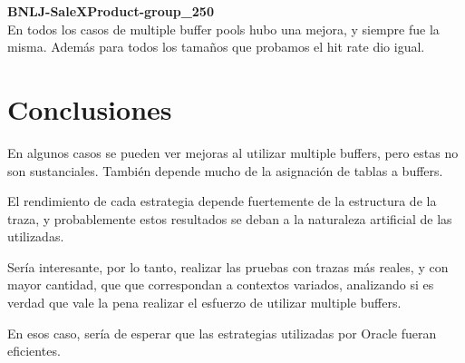 \textbf{BNLJ-SaleXProduct-group\_250} \\

En todos los casos de multiple buffer pools hubo una mejora, 
y siempre fue la misma. Además para todos los tamaños que
probamos el hit rate dio igual.

\section{Conclusiones}

En algunos casos se pueden ver mejoras al utilizar multiple buffers,
pero estas no son sustanciales. También depende mucho de la
asignación de tablas a buffers.

\vspace*{0.5cm}

El rendimiento de cada estrategia depende fuertemente de la 
estructura de la traza, y probablemente estos resultados se 
deban a la naturaleza artificial de las utilizadas. 

\vspace*{0.5cm}

Sería interesante, por lo tanto, realizar las pruebas con 
trazas más reales, y con mayor cantidad, que que correspondan 
a contextos variados, analizando si es verdad que vale la pena
realizar el esfuerzo de utilizar multiple buffers.

\vspace*{0.5cm}

En esos caso, sería de esperar que las estrategias utilizadas
por Oracle fueran eficientes.
